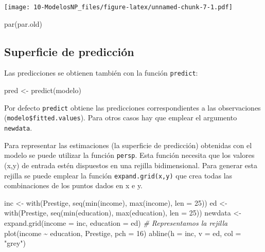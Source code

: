 \documentclass[
]{book}
\newenvironment{Shaded}{\begin{snugshade}}{\end{snugshade}}
\newcommand{\AttributeTok}[1]{\textcolor[rgb]{0.77,0.63,0.00}{#1}}
\newcommand{\CommentTok}[1]{\textcolor[rgb]{0.56,0.35,0.01}{\textit{#1}}}
\newcommand{\DecValTok}[1]{\textcolor[rgb]{0.00,0.00,0.81}{#1}}
\newcommand{\FunctionTok}[1]{\textcolor[rgb]{0.00,0.00,0.00}{#1}}
\newcommand{\NormalTok}[1]{#1}
\newcommand{\OtherTok}[1]{\textcolor[rgb]{0.56,0.35,0.01}{#1}}
\newcommand{\SpecialCharTok}[1]{\textcolor[rgb]{0.00,0.00,0.00}{#1}}
\newcommand{\StringTok}[1]{\textcolor[rgb]{0.31,0.60,0.02}{#1}}
\theoremstyle{break}
\theoremstyle{nonumberplain}
\begin{document}
\texttt{[image: 10-ModelosNP\_files/figure-latex/unnamed-chunk-7-1.pdf]}

\begin{Shaded}
\begin{Highlighting}[]
\FunctionTok{par}\NormalTok{(par.old)}
\end{Highlighting}
\end{Shaded}

\hypertarget{superficie-de-predicciuxf3n}{%
\subsection{Superficie de predicción}\label{superficie-de-predicciuxf3n}}

Las predicciones se obtienen también con la función \texttt{predict}:

\begin{Shaded}
\begin{Highlighting}[]
\NormalTok{pred }\OtherTok{\textless{}{-}} \FunctionTok{predict}\NormalTok{(modelo)}
\end{Highlighting}
\end{Shaded}

Por defecto \texttt{predict} obtiene las predicciones correspondientes a las observaciones (\texttt{modelo\$fitted.values}). Para otros casos hay que emplear el argumento \texttt{newdata}.

Para representar las estimaciones (la superficie de predicción) obtenidas con el modelo se puede
utilizar la función \texttt{persp}. Esta función necesita que los valores (x,y) de entrada estén
dispuestos en una rejilla bidimensional. Para generar esta rejilla se puede emplear la función \texttt{expand.grid(x,y)} que crea todas las combinaciones de los puntos dados en x e y.

\begin{Shaded}
\begin{Highlighting}[]
\NormalTok{inc }\OtherTok{\textless{}{-}} \FunctionTok{with}\NormalTok{(Prestige, }\FunctionTok{seq}\NormalTok{(}\FunctionTok{min}\NormalTok{(income), }\FunctionTok{max}\NormalTok{(income), }\AttributeTok{len =} \DecValTok{25}\NormalTok{))}
\NormalTok{ed }\OtherTok{\textless{}{-}} \FunctionTok{with}\NormalTok{(Prestige, }\FunctionTok{seq}\NormalTok{(}\FunctionTok{min}\NormalTok{(education), }\FunctionTok{max}\NormalTok{(education), }\AttributeTok{len =} \DecValTok{25}\NormalTok{))}
\NormalTok{newdata }\OtherTok{\textless{}{-}} \FunctionTok{expand.grid}\NormalTok{(}\AttributeTok{income =}\NormalTok{ inc, }\AttributeTok{education =}\NormalTok{ ed)}
\CommentTok{\# Representamos la rejilla}
\FunctionTok{plot}\NormalTok{(income }\SpecialCharTok{\textasciitilde{}}\NormalTok{ education, Prestige, }\AttributeTok{pch =} \DecValTok{16}\NormalTok{)}
\FunctionTok{abline}\NormalTok{(}\AttributeTok{h =}\NormalTok{ inc, }\AttributeTok{v =}\NormalTok{ ed, }\AttributeTok{col =} \StringTok{"grey"}\NormalTok{)}
\end{Highlighting}
\end{Shaded}
\end{document}
